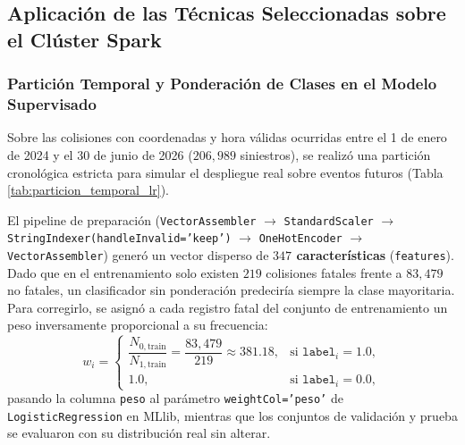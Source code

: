 \documentclass[11pt,a4paper]{article}
\begin{document}
\subsection{Aplicación de las Técnicas Seleccionadas sobre el Clúster Spark}
\label{subsec:aplicacion_mllib_num5}

\subsubsection{Partición Temporal y Ponderación de Clases en el Modelo Supervisado}

Sobre las colisiones con coordenadas y hora válidas ocurridas entre el 1 de enero de 2024 y el 30 de junio de 2026 ($206,989$ siniestros), se realizó una partición cronológica estricta para simular el despliegue real sobre eventos futuros (Tabla \ref{tab:particion_temporal_lr}).

\begin{table}[H]
\centering
\scriptsize
\renewcommand{\arraystretch}{1.2}
\caption{Partición temporal del conjunto de datos para el modelado supervisado en Spark MLlib.}
\label{tab:particion_temporal_lr}
\end{table}

El pipeline de preparación (\texttt{VectorAssembler} $\rightarrow$ \texttt{StandardScaler} $\rightarrow$ \texttt{StringIndexer(handleInvalid='keep')} $\rightarrow$ \texttt{OneHotEncoder} $\rightarrow$ \texttt{VectorAssembler}) generó un vector disperso de \textbf{$347$ características} (\texttt{features}). Dado que en el entrenamiento solo existen $219$ colisiones fatales frente a $83,479$ no fatales, un clasificador sin ponderación predeciría siempre la clase mayoritaria. Para corregirlo, se asignó a cada registro fatal del conjunto de entrenamiento un peso inversamente proporcional a su frecuencia:
\[
w_i = \begin{cases}
\dfrac{N_{0,\text{train}}}{N_{1,\text{train}}} = \dfrac{83{,}479}{219} \approx 381.18, & \text{si } \texttt{label}_i = 1.0, \\[8pt]
1.0, & \text{si } \texttt{label}_i = 0.0,
\end{cases}
\]
pasando la columna \texttt{peso} al parámetro \texttt{weightCol='peso'} de \texttt{LogisticRegression} en MLlib, mientras que los conjuntos de validación y prueba se evaluaron con su distribución real sin alterar.
\end{document}
